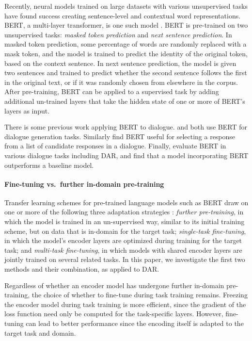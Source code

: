 \documentclass[11pt,a4paper]{article}
\begin{document}
Recently, neural models trained on large datasets with various unsupervised tasks have found success creating sentence-level and contextual word representations. 
BERT, a multi-layer transformer, is one such model \citep{devlinBERTPretrainingDeep2018} . 
BERT is pre-trained on two unsupervised tasks: \emph{masked token prediction} and \emph{next sentence prediction}.
In masked token prediction, some percentage of words are randomly replaced with a mask token, and the model is trained to predict the identity of the original token, based on the context sentence.
In next sentence prediction, the model is given two sentences and trained to predict whether the second sentence follows the first in the original text, or if it was randomly chosen from elsewhere in the corpus.
After pre-training, BERT can be applied to a supervised task by adding additional un-trained layers that take the hidden state of one or more of BERT's layers as input. 

There is some previous work applying BERT to dialogue.
\citet{baoPLATOPretrainedDialogue2019} and \citet{chenSemanticallyConditionedDialog2019a} both use BERT for dialogue generation tasks.
Similarly \citet{vigComparisonTransferLearningApproaches2019} find BERT useful for selecting a response from a list of candidate responses in a dialogue.
Finally, \citet{mehriPretrainingMethodsDialog2019} evaluate BERT in various dialogue tasks including DAR, and find that a model incorporating BERT outperforms a baseline model.

\paragraph{Fine-tuning vs.~further in-domain pre-training}
Transfer learning schemes for pre-trained language models such as BERT draw on one or more of the following three adaptation strategies \citep{sunHowFineTuneBERT2019}:
\emph{further pre-training}, in which the model is trained in an un-supervised way, similar to its initial training scheme, but on data that is in-domain for the target task; 
\emph{single-task fine-tuning}, in which the model's encoder layers are optimized during training for the target task;
and \emph{multi-task fine-tuning}, in which models with shared encoder layers are jointly trained on several related tasks.
In this paper, we investigate the first two methods and their combination, as applied to DAR.

Regardless of whether an encoder model has undergone further in-domain pre-training, the choice of whether to fine-tune during task training remains.
Freezing the encoder model during task training is more efficient, since the gradient of the loss function need only be computed for the task-specific layers.
However, fine-tuning can lead to better performance since the encoding itself is adapted to the target task and domain.
\end{document}
